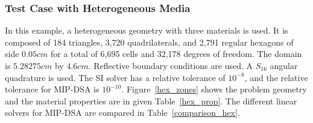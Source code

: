 \documentclass[preprint,10pt]{elsarticle}
\renewcommand{\(}{\left(}
\renewcommand{\)}{\right)}
\renewcommand{\[}{\left[}
\renewcommand{\]}{\right]}
\begin{document}
\subsubsection{Test Case with Heterogeneous Media}

In this example, a heterogeneous geometry with three materials is used. It is 
composed of 184 triangles, 3,720 quadrilaterals, and 2,791 regular hexagons of 
side $0.05cm$ for a total of 6,695 cells and 32,178 degrees of freedom. 
The domain is $5.28275cm$ by $4.6cm$. 
Reflective boundary conditions are used. A $S_{16}$ angular 
quadrature is used. The SI solver has a relative tolerance of 
$10^{-8}$, and the relative tolerance for MIP-DSA is $10^{-10}$. Figure~\ref {hex_zones}
shows the problem geometry and the material properties are in given
Table~\ref {hex_prop}.
The different linear solvers for MIP-DSA are compared in Table~\ref {comparison_hex}.
%
\end{document}
